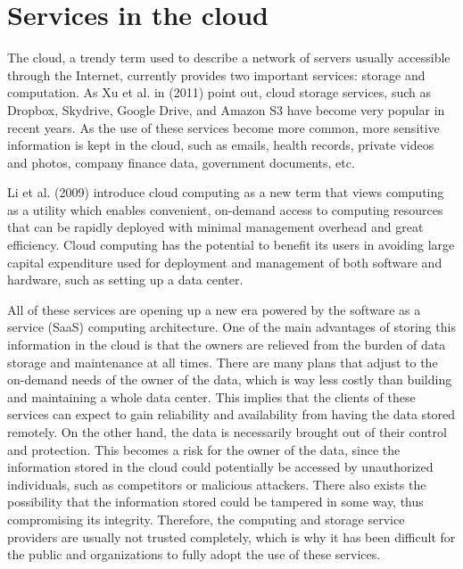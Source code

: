 \section{Services in the cloud}

The cloud, a trendy term used to describe a network of servers usually accessible through the Internet, currently provides two important services: storage and computation. As Xu et al. in (2011) \cite{cryptoeprint:2011:574} point out, cloud storage services, such as Dropbox, Skydrive, Google Drive, and Amazon S3 have become very popular in recent years. As the use of these services become more common, more sensitive information is kept in the cloud, such as emails, health records, private videos and photos, company finance data, government documents, etc. 

Li et al. (2009) \cite{cryptoeprint:2009:593} introduce cloud computing as a new term that views computing as a utility which enables convenient, on-demand access to computing resources that can be rapidly deployed with minimal management overhead and great efficiency. Cloud computing has the potential to benefit its users in avoiding large capital expenditure used for deployment and management of both software and hardware, such as setting up a data center. 

All of these services are opening up a new era powered by the software as a service (SaaS) computing architecture. One of the main advantages of storing this information in the cloud is that the owners are relieved from the burden of data storage and maintenance at all times. There are many plans that adjust to the on-demand needs of the owner of the data, which is way less costly than building and maintaining a whole data center. This implies that the clients of these services can expect to gain reliability and availability from having the data stored remotely. On the other hand, the data is necessarily brought out of their control and protection. This becomes a risk for the owner of the data, since the information stored in the cloud could potentially be accessed by unauthorized individuals, such as competitors or malicious attackers. There also exists the possibility that the information stored could be tampered in some way, thus compromising its integrity. Therefore, the computing and storage service providers are usually not trusted completely, which is why it has been difficult for the public and organizations to fully adopt the use of these services.

